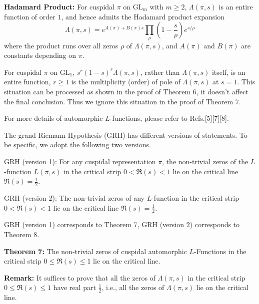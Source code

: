 \documentclass[12pt]{article}
\begin{document}
\textbf{Hadamard Product:}
For cuspidal $\pi$ on $\mathrm{GL}_m$ with $m\geq 2$, $\Lambda(\pi, s)$ is an entire function of order $1$, and hence admits the Hadamard product expansion
\begin{equation}
\Lambda(\pi, s)=e^{A(\pi)+B(\pi)s}\prod_{\rho}\left(1-\frac{s}{\rho}\right)e^{s/\rho}
\end{equation}
where the product runs over all zeros $\rho$ of $\Lambda(\pi, s)$, and $A(\pi)$ and $B(\pi)$ are constants depending on $\pi$.

For cuspidal $\pi$ on $\mathrm{GL}_1$, $s^r(1-s)^r\Lambda(\pi, s)$, rather than $\Lambda(\pi, s)$ itself, is an entire function, $r\geq 1$ is the multiplicity (order) of pole of $\Lambda(\pi, s)$ at $s=1$. This situation can be processed  as shown in the proof of Theorem 6, it doesn't affect the final conclusion. Thus we ignore this situation in the proof of Theorem 7.

For more details of automorphic $L$-functions, please refer to Refs.[5][7][8].

The grand Riemann Hypothesis (GRH) has different versions of statements. To be specific, we adopt the following two versions.

GRH (version 1): For any cuspidal representation $\pi$, the non-trivial zeros of the $L$-function $L(\pi, s)$ in the critical strip $0 < \Re(s) < 1$ lie on the critical line $\Re(s)=\frac{1}{2}$.


GRH (version 2): The non-trivial zeros of any $L$-function in the critical strip $0 < \Re(s) < 1$ lie on the critical line $\Re(s)=\frac{1}{2}$.

GRH (version 1) corresponds to Theorem 7, GRH (version 2) corresponds to Theorem 8.

\textbf{Theorem 7:} The non-trivial zeros of cuspidal automorphic $L$-Functions in the critical strip $0 \leq \Re(s) \leq 1$ lie on the critical line.

\textbf{Remark:} It suffices to prove that all the zeros of $\Lambda(\pi, s)$ in the critical strip $0 \leq \Re(s) \leq 1$ have real part $\frac{1}{2}$, i.e., all the zeros of $\Lambda(\pi, s)$ lie on the critical line.
\end{document}
